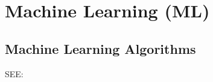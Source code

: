 \chapter{Machine Learning (ML)}

\section{Machine Learning Algorithms}\label{Machine Learning Algorithms}

SEE: 








